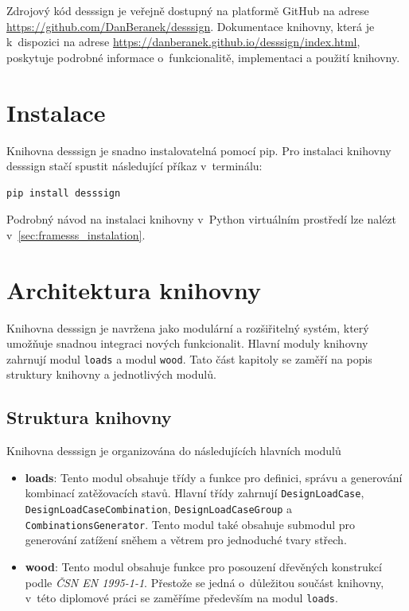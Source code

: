 Zdrojový kód desssign je veřejně dostupný na platformě GitHub na adrese \url{https://github.com/DanBeranek/desssign}. Dokumentace knihovny, která je k~dispozici na adrese \url{https://danberanek.github.io/desssign/index.html}, poskytuje podrobné informace o~funkcionalitě, implementaci a použití knihovny.

\section{Instalace}
Knihovna desssign je snadno instalovatelná pomocí pip. Pro instalaci knihovny desssign stačí spustit následující příkaz v~terminálu:

\begin{verbatim}
pip install desssign
\end{verbatim}

Podrobný návod na instalaci knihovny v~Python virtuálním prostředí lze nalézt v~\autoref{sec:framesss_instalation}.

\section{Architektura knihovny}
Knihovna desssign je navržena jako modulární a rozšiřitelný systém, který umožňuje snadnou integraci nových funkcionalit. Hlavní moduly knihovny zahrnují modul \texttt{loads} a modul \texttt{wood}. Tato část kapitoly se zaměří na popis struktury knihovny a jednotlivých modulů.

\subsection{Struktura knihovny}
Knihovna desssign je organizována do následujících hlavních modulů
\begin{itemize}
    \item \textbf{loads}: Tento modul obsahuje třídy a funkce pro definici, správu a generování kombinací zatěžovacích stavů. Hlavní třídy zahrnují \texttt{DesignLoadCase}, \texttt{DesignLoadCaseCombination}, \texttt{DesignLoadCaseGroup} a \texttt{CombinationsGenerator}. Tento modul také obsahuje submodul pro generování zatížení sněhem a větrem pro jednoduché tvary střech.
    \item \textbf{wood}: Tento modul obsahuje funkce pro posouzení dřevěných konstrukcí podle \textit{ČSN EN 1995-1-1}. Přestože se jedná o~důležitou součást knihovny, v~této diplomové práci se zaměříme především na modul \texttt{loads}.
\end{itemize}

